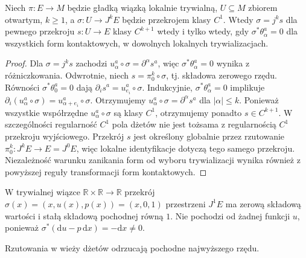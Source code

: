 \begin{twierdzenie}
\label{thm:dzety-contact}
Niech $\pi:E\to M$ będzie gładką wiązką lokalnie
trywialną, $U\subseteq M$ zbiorem otwartym, $k\ge1$,
a $\sigma:U\to J^kE$ będzie przekrojem klasy $C^1$.
Wtedy $\sigma=j^ks$ dla pewnego przekroju
$s:U\to E$ klasy $C^{k+1}$ wtedy i tylko wtedy, gdy
$\sigma^*\theta^a_\alpha=0$ dla wszystkich form
kontaktowych, w dowolnych lokalnych trywializacjach.
\end{twierdzenie}
\begin{proof}
Dla $\sigma=j^ks$ zachodzi
$u^a_\alpha\circ\sigma=\partial^\alpha s^a$,
więc $\sigma^*\theta^a_\alpha=0$ wynika z różniczkowania.
Odwrotnie, niech $s=\pi_0^k\circ\sigma$, tj. składowa
zerowego rzędu. Równości $\sigma^*\theta^a_0=0$ dają
$\partial_i s^a=u^a_{e_i}\circ\sigma$. Indukcyjnie,
$\sigma^*\theta^a_\alpha=0$ implikuje
$\partial_i(u^a_\alpha\circ\sigma)
=u^a_{\alpha+e_i}\circ\sigma$. Otrzymujemy
$u^a_\alpha\circ\sigma=\partial^\alpha s^a$
dla $|\alpha|\le k$. Ponieważ wszystkie współrzędne $u^a_\alpha\circ\sigma$
są klasy $C^1$, otrzymujemy ponadto $s\in C^{k+1}$.
W szczególności regularność $C^1$ pola dżetów nie jest
tożsama z regularnością $C^1$ przekroju wyjściowego.
Przekrój $s$ jest określony globalnie przez
rzutowanie $\pi_0^k:J^kE\to E=J^0E$, więc lokalne
identyfikacje dotyczą tego samego przekroju.
Niezależność warunku zanikania form od wyboru
trywializacji wynika również z powyższej reguły
transformacji form kontaktowych.
\end{proof}

\begin{przyklad}
W trywialnej wiązce $\mathbb R\times\mathbb R\to\mathbb R$
przekrój $\sigma(x)=(x,u(x),p(x))=(x,0,1)$
przestrzeni $J^1E$ ma zerową składową wartości i
stałą składową pochodnej równą $1$. Nie pochodzi od
żadnej funkcji $u$, ponieważ
$\sigma^*(\mathrm du-p\,\mathrm dx)=-\mathrm dx\ne0$.
\end{przyklad}

\begin{center}

{\small Rzutowania w wieży dżetów odrzucają pochodne najwyższego rzędu.}
\end{center}


